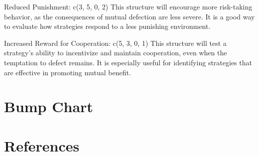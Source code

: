 \documentclass[11pt,preprint]{elsarticle}
\numberwithin{equation}{section}
\numberwithin{figure}{section}
\numberwithin{table}{section}
\begin{document}
Reduced Punishment: c(3, 5, 0, 2) This structure will encourage more
risk-taking behavior, as the consequences of mutual defection are less
severe. It is a good way to evaluate how strategies respond to a less
punishing environment.

Increased Reward for Cooperation: c(5, 3, 0, 1) This structure will test
a strategy's ability to incentivize and maintain cooperation, even when
the temptation to defect remains. It is especially useful for
identifying strategies that are effective in promoting mutual benefit.

\section{Bump Chart}\label{bump-chart}

\newpage

\section*{References}\label{references}
\end{document}
